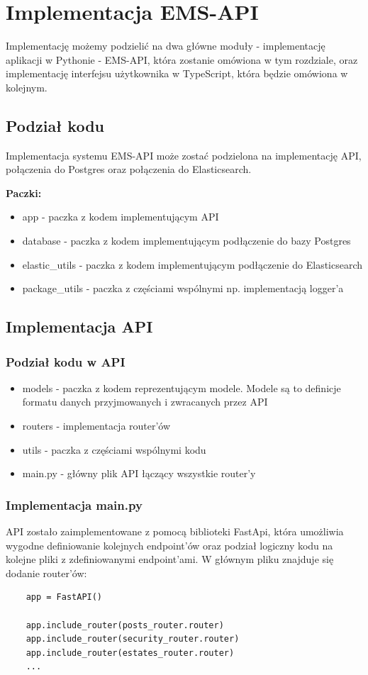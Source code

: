 \newpage
\section{Implementacja EMS-API}
Implementację możemy podzielić na dwa główne moduły - implementację aplikacji w Pythonie - EMS-API, która zostanie omówiona w tym rozdziale, oraz implementację interfejsu użytkownika w TypeScript, która będzie omówiona w kolejnym.

\subsection{Podział kodu}
Implementacja systemu EMS-API może zostać podzielona na implementację API, połączenia do Postgres oraz połączenia do Elasticsearch.

\textbf{Paczki:}
\begin{itemize}
    \item app - paczka z kodem implementującym API
    \item database - paczka z kodem implementującym podłączenie do bazy Postgres
    \item elastic\_utils - paczka z kodem implementującym podłączenie do Elasticsearch
    \item package\_utils - paczka z częściami wspólnymi np. implementacją logger'a
\end{itemize}


\subsection{Implementacja API}
\subsubsection{Podział kodu w API}
\begin{itemize}
    \item models - paczka z kodem reprezentującym modele. Modele są to definicje formatu danych przyjmowanych i zwracanych przez API
    \item routers - implementacja router'ów
    \item utils - paczka z częściami wspólnymi kodu
    \item main.py - główny plik API łączący wszystkie router'y
\end{itemize}
\subsubsection{Implementacja main.py}
API zostało zaimplementowane z pomocą biblioteki FastApi, która umożliwia wygodne definiowanie kolejnych endpoint'ów oraz podział logiczny kodu na kolejne pliki z zdefiniowanymi endpoint'ami. W głównym pliku znajduje się dodanie router'ów:
\begin{verbatim}
    app = FastAPI()
    
    app.include_router(posts_router.router)
    app.include_router(security_router.router)
    app.include_router(estates_router.router)
    ...
\end{verbatim}
